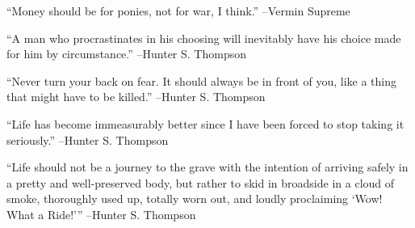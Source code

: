 \documentclass{article}%
\begin{document}
\linebreak%
\vspace{1mm}%
\begin{minipage}{\textwidth}%
\flushleft%
“Money should be for ponies, not for war, I think.”%
\linebreak%
\vspace{1mm}%
–Vermin Supreme%
\linebreak%
\vspace{1mm}%
\end{minipage}%
\linebreak%
\vspace{1mm}%
\begin{minipage}{\textwidth}%
\flushleft%
“A man who procrastinates in his choosing will inevitably have his choice made for him by circumstance.”%
\linebreak%
\vspace{1mm}%
–Hunter S. Thompson%
\linebreak%
\vspace{1mm}%
\end{minipage}%
\linebreak%
\vspace{1mm}%
\begin{minipage}{\textwidth}%
\flushleft%
“Never turn your back on fear. It should always be in front of you, like a thing that might have to be killed.”%
\linebreak%
\vspace{1mm}%
–Hunter S. Thompson%
\linebreak%
\vspace{1mm}%
\end{minipage}%
\linebreak%
\vspace{1mm}%
\begin{minipage}{\textwidth}%
\flushleft%
“Life has become immeasurably better since I have been forced to stop taking it seriously.”%
\linebreak%
\vspace{1mm}%
–Hunter S. Thompson%
\linebreak%
\vspace{1mm}%
\end{minipage}%
\linebreak%
\vspace{1mm}%
\begin{minipage}{\textwidth}%
\flushleft%
“Life should not be a journey to the grave with the intention of arriving safely in a pretty and well{-}preserved body, but rather to skid in broadside in a cloud of smoke, thoroughly used up, totally worn out, and loudly proclaiming ‘Wow! What a Ride!’”%
\linebreak%
\vspace{1mm}%
–Hunter S. Thompson%
\linebreak%
\vspace{1mm}%
\end{minipage}%
\end{document}

